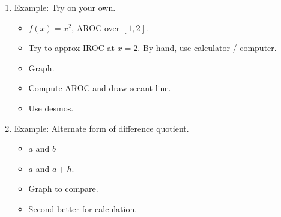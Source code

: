 \documentclass{article}
\begin{document}
\begin{enumerate}
\item Example: Try on your own.
\begin{itemize}
\item $f(x) = x^2$, AROC over $[1,2]$. 
\item Try to approx IROC at $x=2$. By hand, use calculator / computer.
\item Graph. 
\item Compute AROC and draw secant line. 
\item Use desmos. 
\end{itemize}


\item Example: Alternate form of difference quotient.
\begin{itemize}
\item $a$ and $b$
\item $a$ and $a+h$. 
\item Graph to compare. 
\item Second better for calculation.
\end{itemize}

\end{enumerate}


\end{document}
